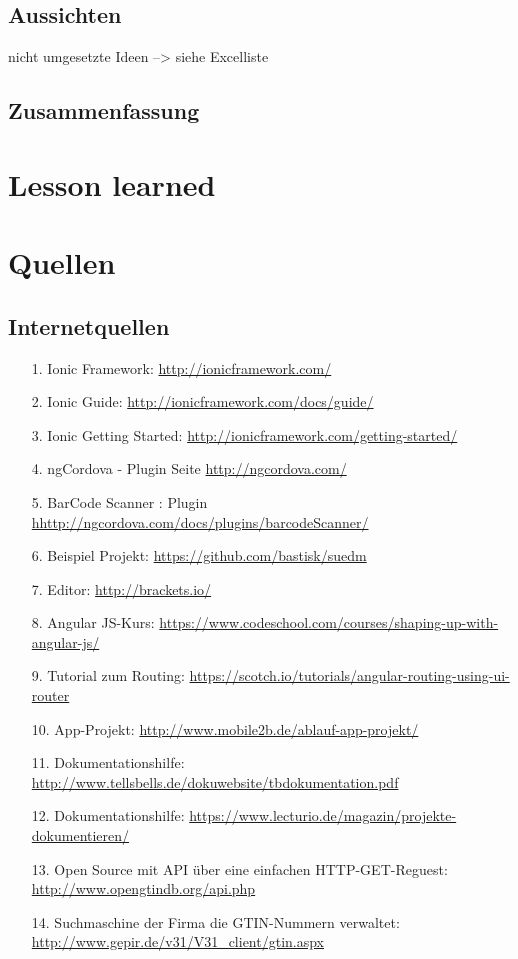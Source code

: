 \documentclass[12pt,a4paper]{article}
\begin{document}
\subsection{Aussichten}
nicht umgesetzte Ideen --> siehe Excelliste
\newpage
\subsection{Zusammenfassung}
\newpage
\section{Lesson learned}
\newpage
\section*{Quellen}
\subsection*{Internetquellen}
\begin{itemize}
\item[1.]Ionic Framework: \url{http://ionicframework.com/}
\item[2.]Ionic Guide: \url{http://ionicframework.com/docs/guide/}
\item[3.]Ionic Getting Started: \url{http://ionicframework.com/getting-started/}
\item[4.]ngCordova - Plugin Seite \url{http://ngcordova.com/}
\item[5.]BarCode Scanner : Plugin \url{hhttp://ngcordova.com/docs/plugins/barcodeScanner/}
\item[6.]Beispiel Projekt: \url{https://github.com/bastisk/suedm}
\item[7.]Editor: \url{http://brackets.io/}
\item[8.]Angular JS-Kurs: \url{https://www.codeschool.com/courses/shaping-up-with-angular-js/}
\item[9.]Tutorial zum Routing: \url{https://scotch.io/tutorials/angular-routing-using-ui-router}
\item[10.]App-Projekt: \url{http://www.mobile2b.de/ablauf-app-projekt/}
\item[11.] Dokumentationshilfe: \url{http://www.tellsbells.de/dokuwebsite/tbdokumentation.pdf}
\item[12.] Dokumentationshilfe: \url{https://www.lecturio.de/magazin/projekte-dokumentieren/}
\item[13.] Open Source mit API über eine einfachen HTTP-GET-Reguest: \url{http://www.opengtindb.org/api.php}
\item[14.] Suchmaschine der Firma die GTIN-Nummern verwaltet: \url{http://www.gepir.de/v31/V31_client/gtin.aspx}
\end{itemize}
\end{document}
